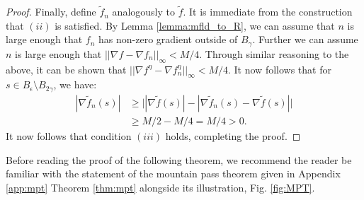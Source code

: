 \documentclass[11pt]{article}
\newcommand{\1}{\mathbf{1}}
\theoremstyle{definition}
\theoremstyle{remark}
\begin{document}
\begin{proof}
    Finally, define $\tilde{f}_n$ analogously to $\tilde{f}$. It is immediate from the construction that $(ii)$ is satisfied. By Lemma \ref{lemma:mfld_to_R}, we can assume that $n$ is large enough that $f_n$ has non-zero gradient outside of $B_\gamma$. Further we can assume $n$ is large enough that $||\nabla f- \nabla f_n||_\infty < M/4$. Through similar reasoning to the above, it can be shown that $||\nabla f^\eta- \nabla f^\eta_{n}||_\infty < M/4$. It now follows that for $s\in B_{\epsilon}\setminus B_{2\gamma}$, we have:
    \begin{equation}\nonumber
    \begin{split}
            |\nabla \tilde{f}_n(s)| & \geq \bigg| |\nabla \tilde{f}(s)| -  |\nabla \tilde{f}_n(s)-\nabla \tilde{f}(s)|\bigg| \\
            & \geq M/2 - M/4 = M/4 > 0.
    \end{split}
    \end{equation}
    It now follows that condition $(iii)$ holds, completing the proof.
 \end{proof}

Before reading the proof of the following theorem, we recommend the reader be familiar with the statement of the mountain pass theorem given in Appendix \ref{app:mpt} Theorem \ref{thm:mpt} alongside its illustration, Fig. \ref{fig:MPT}.
\end{document}
